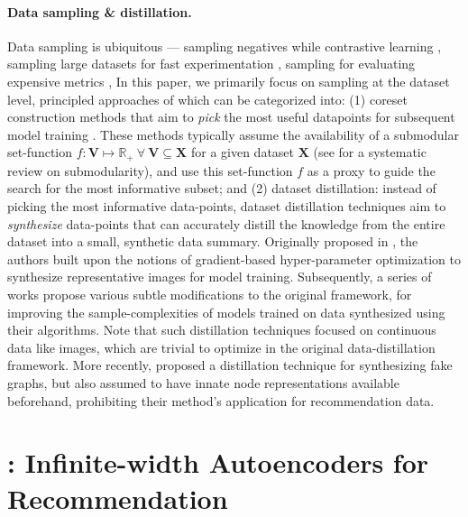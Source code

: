 \documentclass{article}
\begin{document}
\paragraph{Data sampling \& distillation.} Data sampling is ubiquitous --- sampling negatives while contrastive learning \cite{negative_contrastive, negative_contrastive_2}, sampling large datasets for fast experimentation \cite{wsdm22}, sampling for evaluating expensive metrics \cite{sampled_metrics}, \etc In this paper, we primarily focus on sampling at the dataset level, principled approaches of which can be categorized into: (1) coreset construction methods that aim to \emph{pick} the most useful datapoints for subsequent model training \cite{bilevel_coresets, grad_match, selcon_coreset, coreset_scale}. These methods typically assume the availability of a submodular set-function $f : \mathbf{V} \mapsto \mathbb{R}_+ ~ \forall ~ \mathbf{V} \subseteq \mathbf{X}$ for a given dataset $\mathbf{X}$ (see \cite{bilmes_submodularity} for a systematic review on submodularity), and use this set-function $f$ as a proxy to guide the search for the most informative subset; and (2) dataset distillation: instead of picking the most informative data-points, dataset distillation techniques aim to \emph{synthesize} data-points that can accurately distill the knowledge from the entire dataset into a small, synthetic data summary. Originally proposed in \cite{dd_orig}, the authors built upon the notions of gradient-based hyper-parameter optimization \cite{maclaurin} to synthesize representative images for model training. Subsequently, a series of works \cite{zhao_dc, zhao_dsa, kip, kip_conv} propose various subtle modifications to the original framework, for improving the sample-complexities of models trained on data synthesized using their algorithms. Note that such distillation techniques focused on continuous data like images, which are trivial to optimize in the original data-distillation framework. More recently, \cite{graph_distill} proposed a distillation technique for synthesizing fake graphs, but also assumed to have innate node representations available beforehand, prohibiting their method's application for recommendation data.

\section{\model: Infinite-width Autoencoders for Recommendation} \label{sec:inf_ae}
\end{document}
